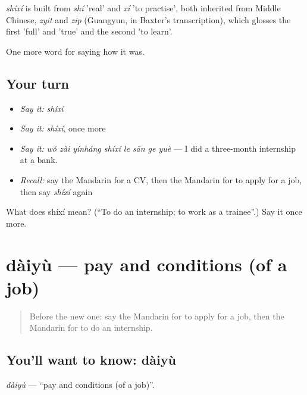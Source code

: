 \begin{cousinweb}
\emph{shíxí} is built from \emph{shí} 'real' and \emph{xí} 'to practise', both inherited from Middle Chinese, \emph{zyit} and \emph{zip} (Guangyun, in Baxter's transcription), which glosses the first 'full' and 'true' and the second 'to learn'.
\end{cousinweb}

\begin{grammarlens}[title={What you've built}]
One more word for saying how it was.
\end{grammarlens}

\subsection*{Your turn}
\begin{itemize}
\raggedright
  \item \emph{Say it:} \emph{shíxí}
  \item \emph{Say it:} \emph{shíxí}, once more
  \item \emph{Say it:} \emph{wǒ zài yínháng shíxí le sān ge yuè} — I did a three-month internship at a bank.
  \item \emph{Recall:} say the Mandarin for a CV, then the Mandarin for to apply for a job, then say \emph{shíxí} again
\end{itemize}

\begin{tcolorbox}[breakable,colback=teal!4,colframe=teal!35!black,title={Before you move on}]
What does shíxí mean? (\textquotedblleft{}To do an internship; to work as a trainee\textquotedblright{}.) Say it once more.
\end{tcolorbox}
\section[dàiyù]{dàiyù — pay and conditions (of a job)}

\label{lesson:ZH-C486-daiyu}



\begin{quote}
Before the new one: say the Mandarin for to apply for a job, then the Mandarin for to do an internship.
\end{quote}

\subsection*{You'll want to know: dàiyù}
\emph{dàiyù} — \textquotedblleft{}pay and conditions (of a job)\textquotedblright{}.


